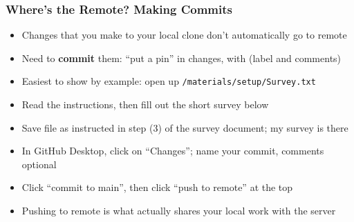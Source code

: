 \documentclass[aspectratio=169]{beamer}
\begin{document}

\begin{frame}
\frametitle{Where's the Remote? Making Commits}
\begin{itemize}
	\item Changes that you make to your local clone don't automatically go to remote
	
	\item Need to \textbf{commit} them: ``put a pin'' in changes, with (label and comments)
	
	\item <2->Easiest to show by example: open up \texttt{/materials/setup/Survey.txt}
	
	\item <2->Read the instructions, then fill out the short survey below
	
	\item <2->Save file as instructed in step (3) of the survey document; my survey is there
	
	\item <3->In GitHub Desktop, click on ``Changes''; name your commit, comments optional
	
	\item <3->Click ``commit to main'', then click ``push to remote'' at the top
	
	\item <3->Pushing to remote is what actually shares your local work with the server
\end{itemize}
\end{frame}
\end{document}
